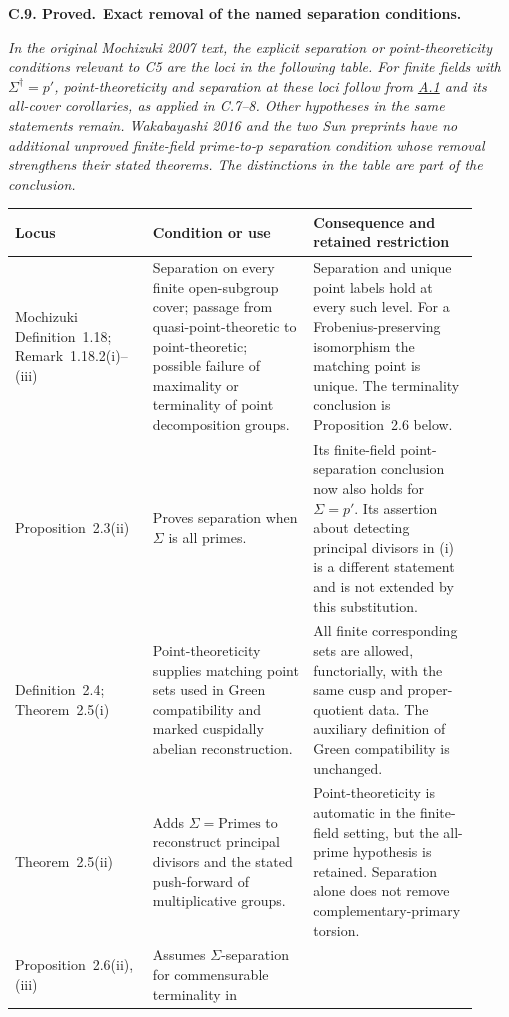 \documentclass[11pt,a4paper]{article}
\newenvironment{claim}[3]{\par\medskip\noindent\hypertarget{#1}{\textbf{#1. #2.}}\ \textbf{#3.}\par\nopagebreak\smallskip\begingroup\itshape}{\endgroup\par\smallskip}
\newcommand{\statementref}[1]{\hyperlink{#1}{#1}}
\begin{document}
\begin{claim}{C.9}{Proved}{Exact removal of the named separation conditions}
In the original Mochizuki 2007 text, the explicit separation or
point-theoreticity conditions relevant to C5 are the loci in the
following table. For finite fields with $\Sigma^\dagger=p'$,
point-theoreticity and separation at these loci follow from
\statementref{A.1} and its all-cover corollaries, as applied in
C.7--8. Other hypotheses in the same statements remain.
Wakabayashi 2016 and the two Sun preprints have no additional
unproved finite-field prime-to-$p$ separation condition whose
removal strengthens their stated theorems. The distinctions in
the table are part of the conclusion.
\end{claim}
\begin{center}\small
\begin{longtable}{p{0.25\linewidth}p{0.33\linewidth}p{0.34\linewidth}}
\toprule
Locus&Condition or use&Consequence and retained restriction\\\midrule
Mochizuki Definition~1.18; Remark~1.18.2(i)--(iii)&
Separation on every finite open-subgroup cover; passage from
quasi-point-theoretic to point-theoretic; possible failure of
maximality or terminality of point decomposition groups.&
Separation and unique point labels hold at every such level.
For a Frobenius-preserving isomorphism the matching point is
unique. The terminality conclusion is Proposition~2.6 below.\\
Proposition~2.3(ii)&
Proves separation when $\Sigma$ is all primes.&
Its finite-field point-separation conclusion now also holds for
$\Sigma=p'$. Its assertion about detecting principal divisors
in (i) is a different statement and is not extended by this
substitution.\\
Definition~2.4; Theorem~2.5(i)&
Point-theoreticity supplies matching point sets used in Green
compatibility and marked cuspidally abelian reconstruction.&
All finite corresponding sets are allowed, functorially, with
the same cusp and proper-quotient data. The auxiliary definition
of Green compatibility is unchanged.\\
Theorem~2.5(ii)&
Adds $\Sigma=\mathrm{Primes}$ to reconstruct principal
divisors and the stated push-forward of multiplicative groups.&
Point-theoreticity is automatic in the finite-field setting,
but the all-prime hypothesis is retained. Separation alone does
not remove complementary-primary torsion.\\
Proposition~2.6(ii),(iii)&
Assumes $\Sigma$-separation for commensurable terminality in

\end{longtable}
\end{center}
\end{document}
